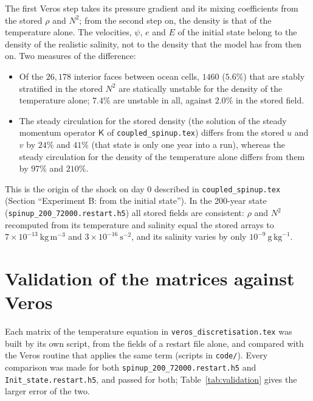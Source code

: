 \documentclass{article}
\begin{document}
The first Veros step takes its pressure gradient and its mixing coefficients from the stored $\rho$ and $N^2$; from the second step on, the density is that of the temperature alone. The velocities, $\psi$, $e$ and $E$ of the initial state belong to the density of the realistic salinity, not to the density that the model has from then on. Two measures of the difference:
\begin{itemize}
\item Of the $26{,}178$ interior faces between ocean cells, $1460$ ($5.6\%$) that are stably stratified in the stored $N^2$ are statically unstable for the density of the temperature alone; $7.4\%$ are unstable in all, against $2.0\%$ in the stored field.
\item The steady circulation for the stored density (the solution of the steady momentum operator $\mathsf{K}$ of \texttt{coupled\_spinup.tex}) differs from the stored $u$ and $v$ by $24\%$ and $41\%$ (that state is only one year into a run), whereas the steady circulation for the density of the temperature alone differs from them by $97\%$ and $210\%$.
\end{itemize}
This is the origin of the shock on day 0 described in \texttt{coupled\_spinup.tex} (Section ``Experiment B: from the initial state'').
In the 200-year state (\texttt{spinup\_200\_72000.restart.h5}) all stored fields are consistent: $\rho$ and $N^2$ recomputed from its temperature and salinity equal the stored arrays to $7\times10^{-13}~\text{kg}\,\text{m}^{-3}$ and $3\times10^{-16}~\text{s}^{-2}$, and its salinity varies by only $10^{-9}~\text{g}\,\text{kg}^{-1}$.

\section{Validation of the matrices against Veros}\label{sec:validation}

Each matrix of the temperature equation in \texttt{veros\_discretisation.tex} was built by its own script, from the fields of a restart file alone, and compared with the Veros routine that applies the same term (scripts in \texttt{code/}). Every comparison was made for both \texttt{spinup\_200\_72000.restart.h5} and \texttt{Init\_state.restart.h5}, and passed for both; Table~\ref{tab:validation} gives the larger error of the two.
\end{document}
